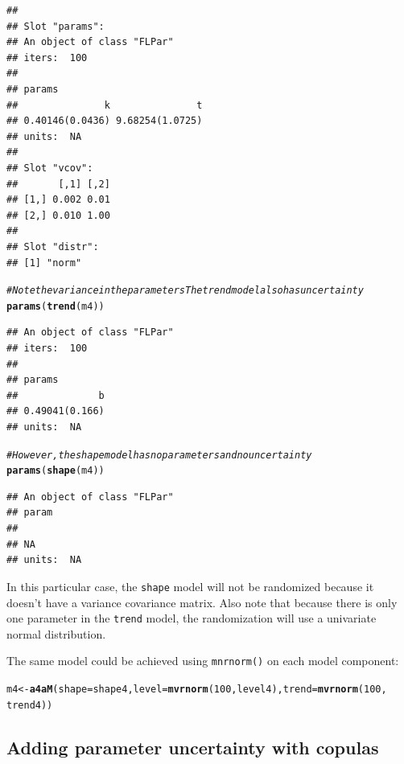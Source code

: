 \documentclass[a4paper,english,10pt]{article}\usepackage[]{graphicx}\usepackage[]{color}
\makeatletter
\newcommand{\hlnum}[1]{\textcolor[rgb]{0.686,0.059,0.569}{#1}}%
\newcommand{\hlcom}[1]{\textcolor[rgb]{0.678,0.584,0.686}{\textit{#1}}}%
\newcommand{\hlstd}[1]{\textcolor[rgb]{0.345,0.345,0.345}{#1}}%
\newcommand{\hlkwb}[1]{\textcolor[rgb]{0.69,0.353,0.396}{#1}}%
\newcommand{\hlkwc}[1]{\textcolor[rgb]{0.333,0.667,0.333}{#1}}%
\newcommand{\hlkwd}[1]{\textcolor[rgb]{0.737,0.353,0.396}{\textbf{#1}}}%
\newenvironment{kframe}{%
 \def\at@end@of@kframe{}%
 \ifinner\ifhmode%
  \def\at@end@of@kframe{\end{minipage}}%
  \begin{minipage}{\columnwidth}%
 \fi\fi%
 \def\FrameCommand##1{\hskip\@totalleftmargin \hskip-\fboxsep
 \colorbox{shadecolor}{##1}\hskip-\fboxsep
     \hskip-\linewidth \hskip-\@totalleftmargin \hskip\columnwidth}%
 \MakeFramed {\advance\hsize-\width
   \@totalleftmargin\z@ \linewidth\hsize
   \@setminipage}}%
 {\par\unskip\endMakeFramed%
 \at@end@of@kframe}
\newenvironment{knitrout}{}{} %
\newcommand{\code}[1]{{\texttt{#1}}}
\makeatother
\begin{document}
\begin{knitrout}
\begin{kframe}
\begin{verbatim}
## 
## Slot "params":
## An object of class "FLPar"
## iters:  100 
## 
## params
##               k               t 
## 0.40146(0.0436) 9.68254(1.0725) 
## units:  NA 
## 
## Slot "vcov":
##       [,1] [,2]
## [1,] 0.002 0.01
## [2,] 0.010 1.00
## 
## Slot "distr":
## [1] "norm"
\end{verbatim}
\begin{alltt}
\hlcom{# Note the variance in the parameters The trend model also has uncertainty}
\hlkwd{params}\hlstd{(}\hlkwd{trend}\hlstd{(m4))}
\end{alltt}
\begin{verbatim}
## An object of class "FLPar"
## iters:  100 
## 
## params
##              b 
## 0.49041(0.166) 
## units:  NA
\end{verbatim}
\begin{alltt}
\hlcom{# However, the shape model has no parameters and no uncertainty}
\hlkwd{params}\hlstd{(}\hlkwd{shape}\hlstd{(m4))}
\end{alltt}
\begin{verbatim}
## An object of class "FLPar"
## param
##    
## NA 
## units:  NA
\end{verbatim}
\end{kframe}
\end{knitrout}


In this particular case, the \code{shape} model will not be randomized because it doesn't have a variance covariance matrix. Also note that because there is only one parameter in the \code{trend} model, the randomization will use a univariate normal distribution.

The same model could be achieved using \code{mnrnorm()} on each model component:

\begin{knitrout}
\color{fgcolor}\begin{kframe}
\begin{alltt}
\hlstd{m4} \hlkwb{<-} \hlkwd{a4aM}\hlstd{(}\hlkwc{shape} \hlstd{= shape4,} \hlkwc{level} \hlstd{=} \hlkwd{mvrnorm}\hlstd{(}\hlnum{100}\hlstd{, level4),} \hlkwc{trend} \hlstd{=} \hlkwd{mvrnorm}\hlstd{(}\hlnum{100}\hlstd{,}
    \hlstd{trend4))}
\end{alltt}
\end{kframe}
\end{knitrout}



\subsection{Adding parameter uncertainty with copulas}
\end{document}
